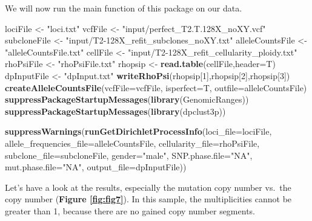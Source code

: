 \documentclass[]{article}
\newenvironment{Shaded}{\begin{snugshade}}{\end{snugshade}}
\newcommand{\DataTypeTok}[1]{\textcolor[rgb]{0.13,0.29,0.53}{#1}}
\newcommand{\DecValTok}[1]{\textcolor[rgb]{0.00,0.00,0.81}{#1}}
\newcommand{\KeywordTok}[1]{\textcolor[rgb]{0.13,0.29,0.53}{\textbf{#1}}}
\newcommand{\NormalTok}[1]{#1}
\newcommand{\StringTok}[1]{\textcolor[rgb]{0.31,0.60,0.02}{#1}}
\begin{document}
We will now run the main function of this package on our data.

\begin{Shaded}
\begin{Highlighting}[]
\NormalTok{lociFile  <-}\StringTok{ "loci.txt"}
\NormalTok{vcfFile <-}\StringTok{ "input/perfect_T2.T.128X_noXY.vcf"}
\NormalTok{subcloneFile <-}\StringTok{ "input/T2-128X_refit_subclones_noXY.txt"}
\NormalTok{alleleCountsFile <-}\StringTok{ "alleleCountsFile.txt"}
\NormalTok{cellFile <-}\StringTok{ "input/T2-128X_refit_cellularity_ploidy.txt"}
\NormalTok{rhoPsiFile <-}\StringTok{ "rhoPsiFile.txt"}
\NormalTok{rhopsip <-}\StringTok{ }\KeywordTok{read.table}\NormalTok{(cellFile,}\DataTypeTok{header=}\NormalTok{T)}
\NormalTok{dpInputFile <-}\StringTok{ "dpInput.txt"}
\KeywordTok{writeRhoPsi}\NormalTok{(rhopsip[}\DecValTok{1}\NormalTok{],rhopsip[}\DecValTok{2}\NormalTok{],rhopsip[}\DecValTok{3}\NormalTok{])}
\KeywordTok{createAlleleCountsFile}\NormalTok{(}\DataTypeTok{vcfFile=}\NormalTok{vcfFile, }\DataTypeTok{isperfect=}\NormalTok{T, }\DataTypeTok{outfile=}\NormalTok{alleleCountsFile)}
\KeywordTok{suppressPackageStartupMessages}\NormalTok{(}\KeywordTok{library}\NormalTok{(GenomicRanges))}
\KeywordTok{suppressPackageStartupMessages}\NormalTok{(}\KeywordTok{library}\NormalTok{(dpclust3p))}
\end{Highlighting}
\end{Shaded}

\begin{Shaded}
\begin{Highlighting}[]
\KeywordTok{suppressWarnings}\NormalTok{(}\KeywordTok{runGetDirichletProcessInfo}\NormalTok{(}\DataTypeTok{loci_file=}\NormalTok{lociFile,}
                                            \DataTypeTok{allele_frequencies_file=}\NormalTok{alleleCountsFile,}
                                            \DataTypeTok{cellularity_file=}\NormalTok{rhoPsiFile,}
                                            \DataTypeTok{subclone_file=}\NormalTok{subcloneFile,}
                                            \DataTypeTok{gender=}\StringTok{"male"}\NormalTok{,}
                                            \DataTypeTok{SNP.phase.file=}\StringTok{"NA"}\NormalTok{,}
                                            \DataTypeTok{mut.phase.file=}\StringTok{"NA"}\NormalTok{,}
                                            \DataTypeTok{output_file=}\NormalTok{dpInputFile))}
\end{Highlighting}
\end{Shaded}

Let's have a look at the results, especially the mutation copy number
vs.~the copy number (\textbf{Figure \ref{fig:fig7}}). In this sample,
the multiplicities cannot be greater than 1, because there are no gained
copy number segments.
\end{document}
